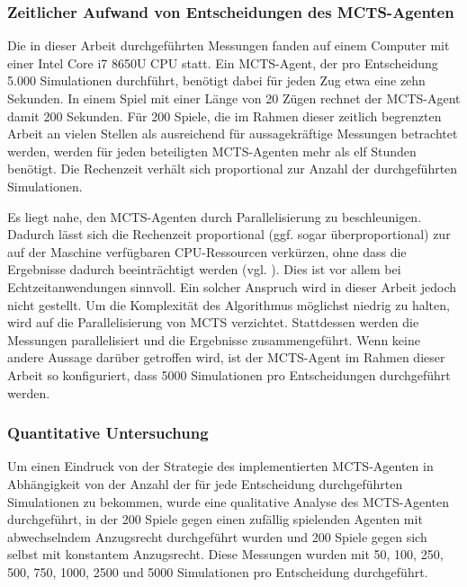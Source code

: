 \subsubsection{Zeitlicher Aufwand von Entscheidungen des MCTS-Agenten}

Die in dieser Arbeit durchgeführten Messungen fanden auf einem Computer mit einer Intel Core i7 8650U CPU statt. Ein MCTS-Agent, der pro Entscheidung 5.000 Simulationen durchführt, benötigt dabei für jeden Zug etwa eine zehn Sekunden. In einem Spiel mit einer Länge von 20 Zügen rechnet der MCTS-Agent damit 200 Sekunden. Für 200 Spiele, die im Rahmen dieser zeitlich begrenzten Arbeit an vielen Stellen als ausreichend für aussagekräftige Messungen betrachtet werden, werden für jeden beteiligten MCTS-Agenten mehr als elf Stunden benötigt. Die Rechenzeit verhält sich proportional zur Anzahl der durchgeführten Simulationen.

Es liegt nahe, den MCTS-Agenten durch Parallelisierung zu beschleunigen. Dadurch lässt sich die Rechenzeit proportional (ggf. sogar überproportional) zur auf der Maschine verfügbaren CPU-Ressourcen verkürzen, ohne dass die Ergebnisse dadurch beeinträchtigt werden (vgl. \cite{Chaslot.2008}). Dies ist vor allem bei Echtzeitanwendungen sinnvoll. Ein solcher Anspruch wird in dieser Arbeit jedoch nicht gestellt. Um die Komplexität des Algorithmus möglichst niedrig zu halten, wird auf die Parallelisierung von MCTS verzichtet. Stattdessen werden die Messungen parallelisiert und die Ergebnisse zusammengeführt. Wenn keine andere Aussage darüber getroffen wird, ist der MCTS-Agent im Rahmen dieser Arbeit so konfiguriert, dass 5000 Simulationen pro Entscheidungen durchgeführt werden.

\subsubsection{Quantitative Untersuchung}

Um einen Eindruck von der Strategie des implementierten MCTS-Agenten in Abhängigkeit von der Anzahl der für jede Entscheidung durchgeführten Simulationen zu bekommen, wurde eine qualitative Analyse des MCTS-Agenten durchgeführt, in der 200 Spiele gegen einen zufällig spielenden Agenten mit abwechselndem Anzugsrecht durchgeführt wurden und 200 Spiele gegen sich selbst mit konstantem Anzugsrecht. Diese Messungen wurden mit 50, 100, 250, 500, 750, 1000, 2500 und 5000 Simulationen pro Entscheidung durchgeführt.

